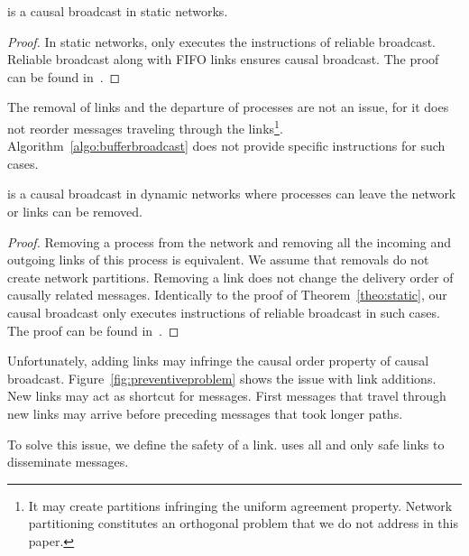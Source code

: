 \begin{theorem}
  \CBROADCAST is a causal broadcast in static networks.
\end{theorem}

\begin{proof}
  In static networks, \CBROADCAST only executes the instructions of reliable
  broadcast. Reliable broadcast along with FIFO links ensures causal broadcast.
  The proof can be found in~\cite{friedman2004causal}.
\end{proof}

The removal of links and the departure of processes are not an issue, for it
does not reorder messages traveling through the links\footnote{It may create
  partitions infringing the uniform agreement property. Network partitioning
  constitutes an orthogonal problem that we do not address in this
  paper.}. Algorithm~\ref{algo:bufferbroadcast} does not provide specific
instructions for such cases.

\begin{lemma}
  \CBROADCAST is a causal broadcast in dynamic networks where processes can
  leave the network or links can be removed.
\end{lemma}

\begin{proof}
  Removing a process from the network and removing all the incoming and outgoing
  links of this process is equivalent. We assume that removals do not create
  network partitions.  Removing a link does not change the delivery order of
  causally related messages. Identically to the proof of
  Theorem~\ref{theo:static}, our causal broadcast only executes instructions of
  reliable broadcast in such cases. The proof can be found
  in~\cite{friedman2004causal}.
\end{proof}

Unfortunately, adding links may infringe the causal order property of causal
broadcast.  Figure~\ref{fig:preventiveproblem} shows the issue with link
additions.  New links may act as shortcut for messages. First messages that
travel through new links may arrive before preceding messages that took longer
paths.

To solve this issue, we define the safety of a link. \CBROADCAST uses all and
only safe links to disseminate messages.

